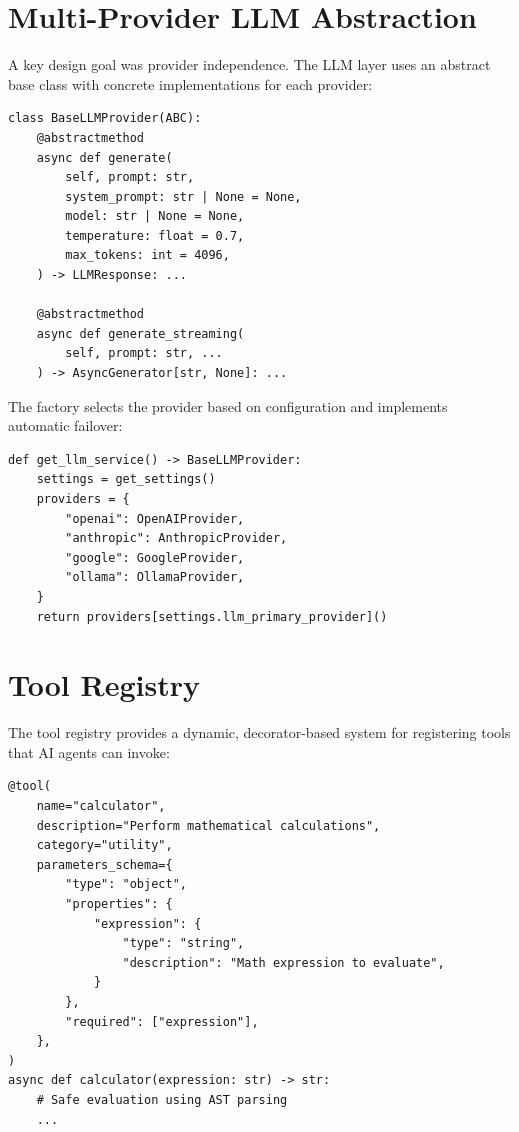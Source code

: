 \documentclass[12pt, a4paper]{report}
\begin{document}
\section{Multi-Provider LLM Abstraction}

A key design goal was provider independence. The LLM layer uses an abstract base class with concrete implementations for each provider:

\begin{lstlisting}[language=Python3, caption={LLM Provider Abstraction}]
class BaseLLMProvider(ABC):
    @abstractmethod
    async def generate(
        self, prompt: str,
        system_prompt: str | None = None,
        model: str | None = None,
        temperature: float = 0.7,
        max_tokens: int = 4096,
    ) -> LLMResponse: ...

    @abstractmethod
    async def generate_streaming(
        self, prompt: str, ...
    ) -> AsyncGenerator[str, None]: ...
\end{lstlisting}

The factory selects the provider based on configuration and implements automatic failover:

\begin{lstlisting}[language=Python3, caption={Provider Factory with Failover}]
def get_llm_service() -> BaseLLMProvider:
    settings = get_settings()
    providers = {
        "openai": OpenAIProvider,
        "anthropic": AnthropicProvider,
        "google": GoogleProvider,
        "ollama": OllamaProvider,
    }
    return providers[settings.llm_primary_provider]()
\end{lstlisting}

\section{Tool Registry}

The tool registry provides a dynamic, decorator-based system for registering tools that AI agents can invoke:

\begin{lstlisting}[language=Python3, caption={Tool Registration via Decorator}]
@tool(
    name="calculator",
    description="Perform mathematical calculations",
    category="utility",
    parameters_schema={
        "type": "object",
        "properties": {
            "expression": {
                "type": "string",
                "description": "Math expression to evaluate",
            }
        },
        "required": ["expression"],
    },
)
async def calculator(expression: str) -> str:
    # Safe evaluation using AST parsing
    ...
\end{lstlisting}
\end{document}
